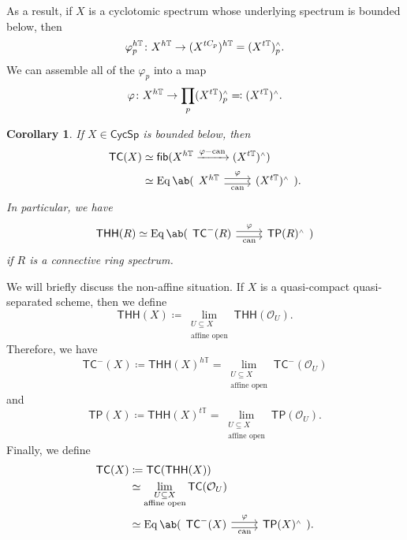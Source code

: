 \documentclass[10pt, oneside]{memoir}
\newtheorem{cor}[thm]{Corollary}
\theoremstyle{definition}
\theoremstyle{remark}
\theoremstyle{plain}
\theoremstyle{definition}
\theoremstyle{remark}
\newcommand{\mc}[1]{\mathcal{#1}}
\newcommand{\T}{\mathbb{T}}
\newcommand{\on}[1]{\operatorname{#1}}
\newcommand{\ms}[1]{\mathsf{#1}}
\newcommand{\1}{\mathbf{1}}
\newcommand{\2}{\mathbf{2}}
\newcommand{\3}{\mathbf{3}}
\newcommand{\THH}{\ms{THH}}
\newcommand{\TC}{\ms{TC}}
\newcommand{\TP}{\ms{TP}}
\newcommand{\sw}{\mathsmaller{\wedge}}
\begin{document}
As a result, if $X$ is a cyclotomic spectrum whose underlying spectrum is bounded below, then
\[ \varphi_p^{h\T} \colon X^{h\T} \to (X^{tC_p})^{h\T} = (X^{t\T})_p^{\sw}. \]
We can assemble all of the $\varphi_p$ into a map
\[ \varphi \colon X^{h\T} \to \prod_p (X^{t\T})^{\sw}_p \eqqcolon (X^{t\T})^{\sw}. \]

\begin{cor}
    If $X \in \ms{CycSp}$ is bounded below, then
    \begin{align*}
        \TC(X) &\simeq \ms{fib} (X^{h\T} \xrightarrow{\varphi-\on{can}} (X^{t\T})^{\sw}) \\
        &\simeq \on{Eq} \ab(\begin{tikzcd}[ampersand replacement=\&]
            X^{h\T} \ar[shift left=1]{r}{\varphi} \ar[shift right=1]{r}[swap]{\on{can}} \& (X^{t\T})^{\sw}
        \end{tikzcd}).
    \end{align*}
    In particular, we have
    \[ \THH(R) \simeq \on{Eq} \ab(\begin{tikzcd}[ampersand replacement=\&]
        \TC^-(R) \ar[shift left=1]{r}{\varphi} \ar[shift right=1]{r}[swap]{\on{can}} \& \TP(R)^{\sw}
    \end{tikzcd}) \]
    if $R$ is a connective ring spectrum.
\end{cor}

We will briefly discuss the non-affine situation. If $X$ is a quasi-compact quasi-separated scheme, then we define
\[ \THH(X) \coloneqq \lim_{\substack{U \subseteq X \\ \text{affine open}}} \THH(\mc{O}_U). \]
Therefore, we have
\[ \TC^-(X) \coloneqq \THH(X)^{h\T} = \lim_{\substack{U \subseteq X \\ \text{affine open}}} \TC^-(\mc{O}_U) \]
and
\[ \TP(X) \coloneqq \THH(X)^{t\T} = \lim_{\substack{U \subseteq X \\ \text{affine open}}} \TP(\mc{O}_U). \]
Finally, we define
\begin{align*}
    \TC(X) &\coloneqq \TC(\THH(X))\\ 
    &\simeq \lim_{\substack{U \subseteq X \\ \text{affine open}}} \TC(\mc{O}_U) \\
    &\simeq \on{Eq} \ab(\begin{tikzcd}[ampersand replacement=\&]
        \TC^-(X) \ar[shift left=1]{r}{\varphi} \ar[shift right=1]{r}[swap]{\on{can}} \& \TP(X)^{\sw}
    \end{tikzcd}).
\end{align*}
\end{document}

